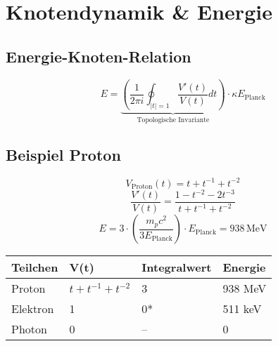 \section{Knotendynamik \& Energie}

\subsection{Energie-Knoten-Relation}
\[
E = \underbrace{\left( \frac{1}{2\pi i} \oint_{|t|=1} \frac{V'(t)}{V(t)} dt \right)}_{\text{Topologische Invariante}} \cdot \kappa E_{\text{Planck}}
\]

\subsection{Beispiel Proton}
\[
V_{\text{Proton}}(t) = t + t^{-1} + t^{-2}
\]
\[
\frac{V'(t)}{V(t)} = \frac{1 - t^{-2} - 2t^{-3}}{t + t^{-1} + t^{-2}}
\]
\[
E = 3 \cdot \left( \frac{m_p c^2}{3 E_{\text{Planck}}} \right) \cdot E_{\text{Planck}} = 938 \, \text{MeV}
\]

\begin{table}[h]
\centering
\begin{tabular}{|l|l|l|l|}
\hline
\textbf{Teilchen} & \textbf{V(t)} & \textbf{Integralwert} & \textbf{Energie} \\ \hline
Proton & $t + t^{-1} + t^{-2}$ & 3 & 938 MeV \\ \hline
Elektron & 1 & 0* & 511 keV \\ \hline
Photon & 0 & -- & 0 \\ \hline
\end{tabular}
\end{table}